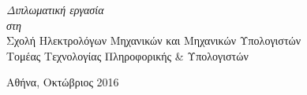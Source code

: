 \documentclass[
11pt, %
english, %
singlespacing, %
parskip, %
headsepline, %
]{MastersDoctoralThesis} %
\begin{document}
\begin{titlepage}
\begin{center}
\large \textit{Διπλωματική εργασία}\\[0.3cm] %
\textit{στη}\\[0.4cm]
  Σχολή Ηλεκτρολόγων Μηχανικών και Μηχανικών Υπολογιστών \\ Τομέας Τεχνολογίας Πληροφορικής \& Υπολογιστών\\[2cm] %

\vfill

{\large Αθήνα, Οκτώβριος 2016}\\[4cm] %

\vfill
\end{center}
\end{titlepage}


%
%
%
%
\end{document}
